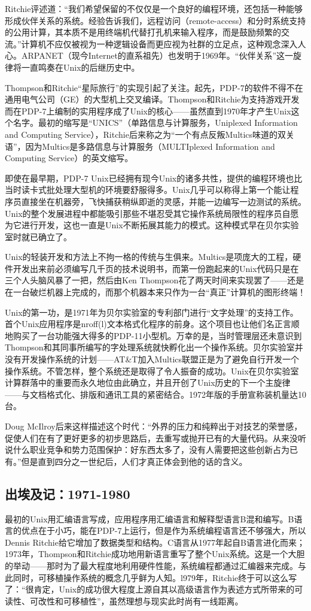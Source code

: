 \documentclass[12pt,oneside]{book}
\begin{document}
Ritchie评述道：“我们希望保留的不仅仅是一个良好的编程环境，还包括一种能够形成伙伴关系的系统。经验告诉我们，远程访问（remote-access）和分时系统支持的公用计算，其本质不是用终端机代替打孔机来输入程序，而是鼓励频繁的交流。”计算机不应仅被视为一种逻辑设备而更应视为社群的立足点，这种观念深入人心。ARPANET（现今Internet的直系祖先）也发明于1969年。“伙伴关系”这一旋律将一直鸣奏在Unix的后继历史中。

Thompson和Ritchie“星际旅行”的实现引起了关注。起先，PDP-7的软件不得不在通用电气公司（GE）的大型机上交叉编译。Thompson和Ritchie为支持游戏开发而在PDP-7上编制的实用程序成了Unix的核心——虽然直到1970年才产生Unix这个名字。最初的缩写是“UNICS”（单路信息与计算服务，Uniplexed Information and Computing Service），Ritchie后来称之为“一个有点反叛Multics味道的双关语”，因为Multics是多路信息与计算服务（MULTIplexed Information and Computing Service）的英文缩写。

即使在最早期，PDP-7 Unix已经拥有现今Unix的诸多共性，提供的编程环境也比当时读卡式批处理大型机的环境要舒服得多。Unix几乎可以称得上第一个能让程序员直接坐在机器旁，飞快捕获稍纵即逝的灵感，并能一边编写一边测试的系统。Unix的整个发展进程中都能吸引那些不堪忍受其它操作系统局限性的程序员自愿为它进行开发，这也一直是Unix不断拓展其能力的模式。这种模式早在贝尔实验室时就已确立了。

Unix的轻装开发和方法上不拘一格的传统与生俱来。Multics是项庞大的工程，硬件开发出来前必须编写几千页的技术说明书，而第一份跑起来的Unix代码只是在三个人头脑风暴了一把，然后由Ken Thompson花了两天时间来实现罢了——还是在一台破烂机器上完成的，而那个机器本来只作为一台“真正”计算机的图形终端！

Unix的第一功，是1971年为贝尔实验室的专利部门进行“文字处理”的支持工作。首个Unix应用程序是nroff(l)文本格式化程序的前身。这个项目也让他们名正言顺地购买了一台功能强大得多的PDP-11小型机。万幸的是，当时管理层还未意识到Thompson和其同事所编写的字处理系统就快孵化出一个操作系统。贝尔实验室并没有开发操作系统的计划——AT\&{}T加入Multics联盟正是为了避免自行开发一个操作系统。不管怎样，整个系统还是取得了令人振奋的成功。Unix在贝尔实验室计算群落中的重要而永久地位由此确立，并且开创了Unix历史的下一个主旋律——与文档格式化、排版和通讯工具的紧密结合。1972年版的手册宣称装机量达10台。

Doug McIlroy\cite{McIlroy91}后来这样描述这个时代：“外界的压力和纯粹出于对技艺的荣誉感，促使人们在有了更好更多的初步思路后，去重写或抛开已有的大量代码。从来没听说什么职业竞争和势力范围保护：好东西太多了，没有人需要把这些创新占为已有。”但是直到四分之一世纪后，人们才真正体会到他的话的含义。


\subsection{出埃及记：1971-1980}
最初的Unix用汇编语言写成，应用程序用汇编语言和解释型语言B混和编写。B语言的优点在于小巧，能在PDP-7上运行，但是作为系统编程语言还不够强大，所以Dennis Ritchie给它增加了数据类型和结构。C语言从1977年起自B语言进化而来；1973年，Thompson和Ritchie成功地用新语言重写了整个Unix系统。这是一个大胆的举动——那时为了最大程度地利用硬件性能，系统编程都通过汇编器来完成。与此同时，可移植操作系统的概念几乎鲜为人知。l979年，Ritchie终于可以这么写了：“很肯定，Unix的成功很大程度上源自其以高级语言作为表述方式所带来的可读性、可改性和可移植性”，虽然理想与现实此时尚有一线距离。
\end{document}
